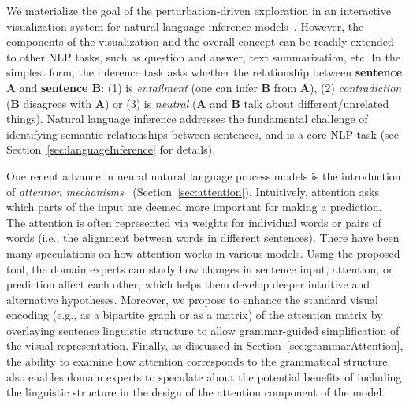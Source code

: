 We materialize the goal of the perturbation-driven exploration in an interactive visualization system for natural language inference models~\cite{Parikh2016}.
However, the components of the visualization and the overall concept can be readily extended to other NLP tasks, such as question and answer, text summarization, etc.
%
In the simplest form, the inference task asks whether the
relationship between \textbf{sentence A} and \textbf{sentence B}: (1) is \emph{entailment} (one can infer \textbf{B} from \textbf{A}), (2) \emph{contradiction} (\textbf{B} disagrees with \textbf{A}) or (3) is \emph{neutral} (\textbf{A} and \textbf{B} talk about different/unrelated things).
Natural language inference addresses the fundamental challenge of identifying semantic relationships between sentences, and is a core NLP task (see Section~\ref{sec:languageInference} for details).

One recent advance in neural natural language process models is the
introduction of \emph{attention
  mechanisms}~\cite{bahdanau2014neural,VaswaniShazeerParmar2017}
(Section~\ref{sec:attention}). Intuitively, attention asks which parts of the
input are deemed more important for making a prediction. The attention is often represented via weights for individual words or pairs of words (i.e., the alignment between words in different sentences).
%
There have been many speculations on how attention works in various models.
Using the proposed tool, the domain experts can study how changes in sentence input, attention, or prediction affect each other, which helps them develop deeper intuitive and alternative hypotheses.
Moreover, we propose to enhance the standard visual encoding (e.g., as a bipartite graph or as a matrix) of the attention matrix by overlaying sentence linguistic structure to allow grammar-guided simplification of the visual representation.
%
Finally, as discussed in Section~\ref{sec:grammarAttention}, the ability to examine how attention corresponds to the grammatical structure also enables domain experts to speculate about the potential benefits of including the linguistic structure in the design of the attention component of the model.

